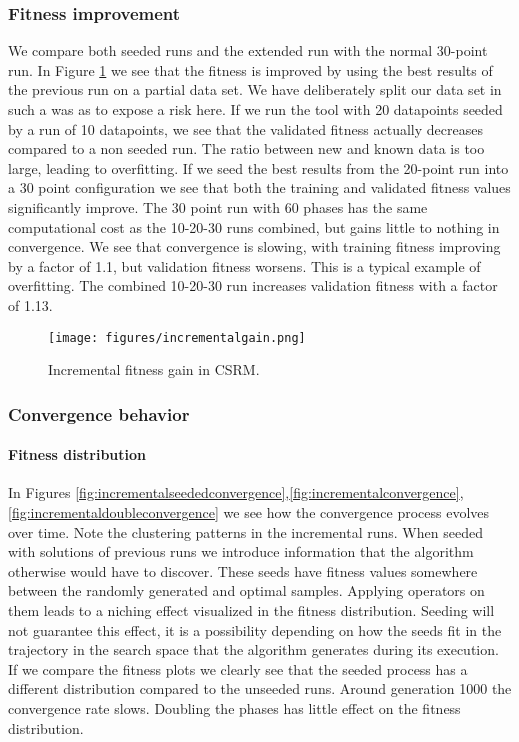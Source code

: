\subsubsection{Fitness improvement}
We compare both seeded runs and the extended run with the normal 30-point run. In Figure \ref{fig:incrementalgain} we see that the fitness is improved by using the best results of the previous run on a partial data set. We have deliberately split our data set in such a was as to expose a risk here. If we run the tool with 20 datapoints seeded by a run of 10 datapoints, we see that the validated fitness actually decreases compared to a non seeded run. The ratio between new and known data is too large, leading to overfitting. If we seed the best results from the 20-point run into a 30 point configuration we see that both the training and validated fitness values significantly improve. 
The 30 point run with 60 phases has the same computational cost as the 10-20-30 runs combined, but gains little to nothing in convergence. We see that convergence is slowing, with training fitness improving by a factor of 1.1, but validation fitness worsens. This is a typical example of overfitting. The combined 10-20-30 run increases validation fitness with a factor of 1.13.
\begin{figure}
    \centering
    \texttt{[image: figures/incrementalgain.png]}
    \caption{Incremental fitness gain in CSRM.}
    \label{fig:incrementalgain}
\end{figure}
\subsubsection{Convergence behavior}
\paragraph{Fitness distribution}
In Figures \ref{fig:incrementalseededconvergence},\ref{fig:incrementalconvergence},\ref{fig:incrementaldoubleconvergence} we see how the convergence process evolves over time. 
Note the clustering patterns in the incremental runs. When seeded with solutions of previous runs we introduce information that the algorithm otherwise would have to discover. These seeds have fitness values somewhere between the randomly generated and optimal samples. Applying operators on them leads to a niching effect visualized in the fitness distribution. Seeding will not guarantee this effect, it is a possibility depending on how the seeds fit in the trajectory in the search space that the algorithm generates during its execution.
If we compare the fitness plots we clearly see that the seeded process has a different distribution compared to the unseeded runs. Around generation 1000 the convergence rate slows. Doubling the phases has little effect on the fitness distribution. 


